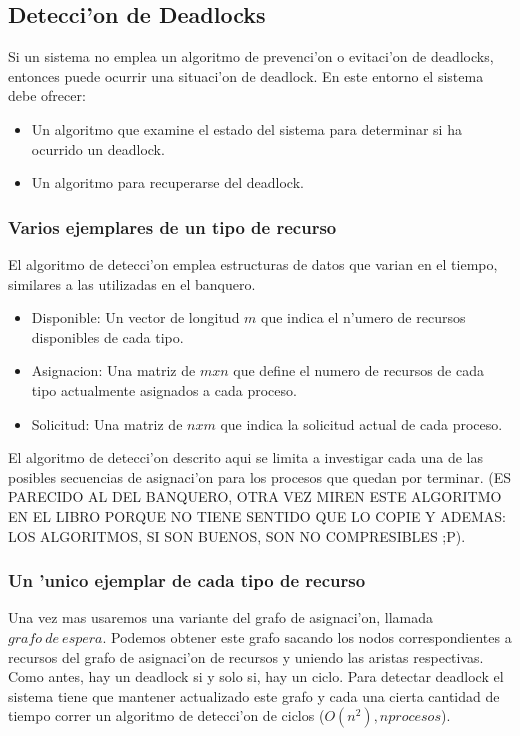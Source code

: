 \subsection{Detecci'on de Deadlocks}
Si un sistema no emplea un algoritmo de prevenci'on o evitaci'on de deadlocks, entonces puede ocurrir una situaci'on de deadlock. En este entorno el sistema debe ofrecer:
\begin{itemize}
 \item Un algoritmo que examine el estado del sistema para determinar si ha ocurrido un deadlock.
 \item Un algoritmo para recuperarse del deadlock.
\end{itemize}

\subsubsection{Varios ejemplares de un tipo de recurso}
El algoritmo de detecci'on emplea estructuras de datos que varian en el tiempo, similares a las utilizadas en el banquero.

\begin{itemize}
 \item Disponible: Un vector de longitud $m$ que indica el n'umero de recursos disponibles de cada tipo.
 \item Asignacion: Una matriz de $mxn$ que define el numero de recursos de cada tipo actualmente asignados a cada proceso.
 \item Solicitud: Una matriz de $nxm$ que indica la solicitud actual de cada proceso.
\end{itemize}
El algoritmo de detecci'on descrito aqui se limita a investigar cada una de las posibles secuencias de asignaci'on para los procesos que quedan por terminar. (ES PARECIDO AL DEL BANQUERO, OTRA VEZ MIREN ESTE ALGORITMO EN EL LIBRO PORQUE NO TIENE SENTIDO QUE LO COPIE Y ADEMAS: LOS ALGORITMOS, SI SON BUENOS, SON NO COMPRESIBLES ;P).

\subsubsection{Un 'unico ejemplar de cada tipo de recurso}
Una vez mas usaremos una variante del grafo de asignaci'on, llamada $grafo\ de\ espera$. Podemos obtener este grafo sacando los nodos correspondientes a recursos del grafo de asignaci'on de recursos y uniendo las aristas respectivas.
Como antes, hay un deadlock si y solo si, hay un ciclo. Para detectar deadlock el sistema tiene que mantener actualizado este grafo y cada una cierta cantidad de tiempo correr un algoritmo de detecci'on de ciclos ($O(n^{2}), n procesos$).

